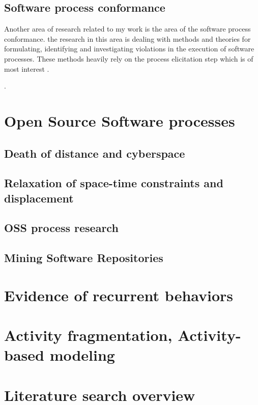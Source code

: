 \subsection{Software process conformance}
Another area of research related to my work is the area of the software process conformance. 
the research in this area is dealing with methods and theories for formulating, identifying and
investigating violations in the execution of software processes. These methods heavily rely
on the process elicitation step which is of most interest . 

.

\section{Open Source Software processes}\label{oss.processes}

\subsection{Death of distance and cyberspace}
\subsection{Relaxation of space-time constraints and displacement}
\subsection{OSS process research}
\subsection{Mining Software Repositories}\label{background.msr.summary}


\section{Evidence of recurrent behaviors}

\section{Activity fragmentation, Activity-based modeling}\label{activity}

\section{Literature search overview}


